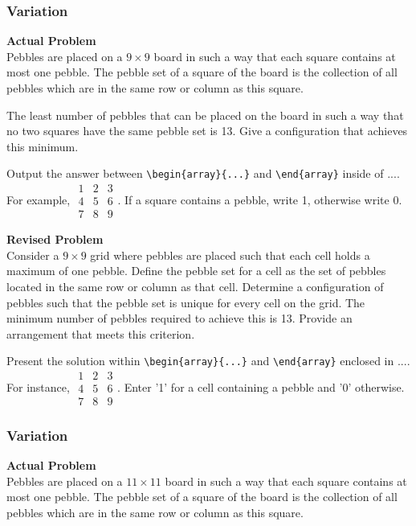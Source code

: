 \subsubsection{Variation}
\textbf{Actual Problem}\\
Pebbles are placed on a $9 \times 9$ board in such a way that each square contains at most one pebble. The pebble set of a square of the board is the collection of all pebbles which are in the same row or column as this square.

The least number of pebbles that can be placed on the board in such a way that no two squares have the same pebble set is 13. Give a configuration that achieves this minimum.

Output the answer between \verb|\begin{array}{...}| and \verb|\end{array}| inside of $\boxed{...}$. For example, $\boxed{\begin{array}{ccc}1 & 2 & 3 \\ 4 & 5 & 6 \\ 7 & 8 & 9\end{array}}$.
If a square contains a pebble, write 1, otherwise write 0.

\textbf{Revised Problem}\\
Consider a $9 \times 9$ grid where pebbles are placed such that each cell holds a maximum of one pebble. Define the pebble set for a cell as the set of pebbles located in the same row or column as that cell. Determine a configuration of pebbles such that the pebble set is unique for every cell on the grid. The minimum number of pebbles required to achieve this is 13. Provide an arrangement that meets this criterion.

Present the solution within \verb|\begin{array}{...}| and \verb|\end{array}| enclosed in $\boxed{...}$. For instance, $\boxed{\begin{array}{ccc}1 & 2 & 3 \\ 4 & 5 & 6 \\ 7 & 8 & 9\end{array}}$. Enter '1' for a cell containing a pebble and '0' otherwise.

\subsubsection{Variation}
\textbf{Actual Problem}\\
Pebbles are placed on a $11 \times 11$ board in such a way that each square contains at most one pebble. The pebble set of a square of the board is the collection of all pebbles which are in the same row or column as this square.

